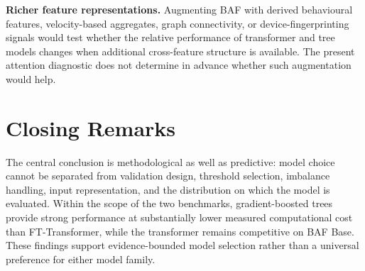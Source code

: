 \textbf{Richer feature representations.} Augmenting BAF with derived behavioural features, velocity-based aggregates, graph connectivity, or device-fingerprinting signals would test whether the relative performance of transformer and tree models changes when additional cross-feature structure is available. The present attention diagnostic does not determine in advance whether such augmentation would help.

\section{Closing Remarks}

The central conclusion is methodological as well as predictive: model choice cannot be separated from validation design, threshold selection, imbalance handling, input representation, and the distribution on which the model is evaluated. Within the scope of the two benchmarks, gradient-boosted trees provide strong performance at substantially lower measured computational cost than FT-Transformer, while the transformer remains competitive on BAF Base. These findings support evidence-bounded model selection rather than a universal preference for either model family.
